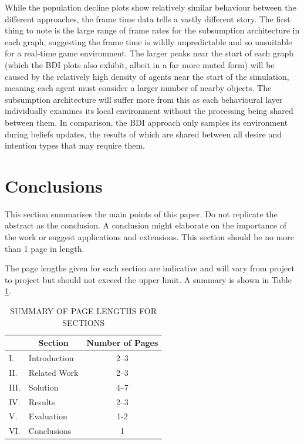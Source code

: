 \documentclass[12pt,a4paper]{article}
\begin{document}
While the population decline plots show relatively similar behaviour between the different approaches, the frame time data tells a vastly different story. The first thing to note is the large range of frame rates for the subsumption architecture in each graph, suggesting the frame time is wildly unpredictable and so unsuitable for a real-time game environment. The larger peaks near the start of each graph (which the BDI plots also exhibit, albeit in a far more muted form) will be caused by the relatively high density of agents near the start of the simulation, meaning each agent must consider a larger number of nearby objects. The subsumption architecture will suffer more from this as each behavioural layer individually examines its local environment without the processing being shared between them. In comparison, the BDI approach only samples its environment during beliefs updates, the results of which are shared between all desire and intention types that may require them.



\section{Conclusions}

This section summarises the main points of this paper.  Do not replicate the abstract as the conclusion.  A conclusion might elaborate on the importance of the work or suggest applications and extensions.  This section should be no more than 1 page in length.

The page lengths given for each section are indicative and will vary from project to project but should not exceed the upper limit.  A summary is shown in Table \ref{summary}.

\begin{table}[htb]
\centering
\caption{SUMMARY OF PAGE LENGTHS FOR SECTIONS}
\vspace*{6pt}
\label{summary}
\begin{tabular}{|ll|c|} \hline
& \multicolumn{1}{c|}{\bf Section} & {\bf Number of Pages} \\ \hline
I. & Introduction & 2--3 \\ \hline
II. & Related Work & 2--3 \\ \hline
III. & Solution & 4--7 \\ \hline
IV. & Results & 2--3 \\ \hline
V. & Evaluation & 1-2 \\ \hline
VI. & Conclusions & 1 \\ \hline
\end{tabular}
\end{table}



\end{document}
